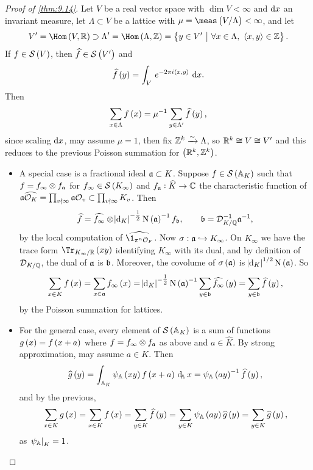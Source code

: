 \begin{proof}[Proof of \ref{thm:9.14}]
Let $ V $ be a real vector space with $ \dim V < \infty $ and $ \mathrm{d} x $ an invariant measure, let $ \Lambda \subset V $ be a lattice with $ \mu = \meas\br{V / \Lambda} < \infty $, and let
$$ V' = \Hom\br{V, \RR} \supset \Lambda' = \Hom\br{\Lambda, \ZZ} = \cbr{y \in V' \st \forall x \in \Lambda, \ \abr{x, y} \in \ZZ}. $$
If $ f \in \SSS\br{V} $, then $ \widehat{f} \in \SSS\br{V'} $ and
$$ \widehat{f}\br{y} = \intd{V}{}{e^{-2\pi i\abr{x, y}}}{x}. $$
Then
$$ \sum_{x \in \Lambda} f\br{x} = \mu^{-1}\sum_{y \in \Lambda'} \widehat{f}\br{y}, $$
since scaling $ \mathrm{d} x $, may assume $ \mu = 1 $, then fix $ \mathbb{Z}^k \xrightarrow{\sim} \Lambda $, so $ \mathbb{R}^k \cong V \cong V' $ and this reduces to the previous Poisson summation for $ \br{\RR^k, \ZZ^k} $.

\pagebreak

\begin{itemize}
\item A special case is a fractional ideal $ \mathfrak{a} \subset K $. Suppose $ f \in \SSS\br{\AA_K} $ such that $ f = f_\infty \otimes f_{\mathfrak{a}} $ for $ f_\infty \in \SSS\br{K_\infty} $ and $ f_{\mathfrak{a}} : \widehat{K} \to \mathbb{C} $ the characteristic function of $ \mathfrak{a}\widehat{\mathcal{O}_K} = \prod_{v \nmid \infty} \mathfrak{a}\mathcal{O}_v \subset \prod_{v \nmid \infty} K_v $. Then
$$ \widehat{f} = \widehat{f_\infty} \otimes \abs{\d_K}^{-\tfrac{1}{2}}\N\br{\aaa}^{-1}f_\bbb, \qquad \bbb = \DDD_{K / \QQ}^{-1}\aaa^{-1}, $$
by the local computation of $ \widehat{\1_{\pi^n\OOO_F}} $. Now $ \sigma : \mathfrak{a} \hookrightarrow K_\infty $. On $ K_\infty $ we have the trace form $ \Tr_{K_\infty / \RR}\br{xy} $ identifying $ K_\infty $ with its dual, and by definition of $ \mathcal{D}_{K / \mathbb{Q}} $, the dual of $ \mathfrak{a} $ is $ \mathfrak{b} $. Moreover, the covolume of $ \sigma\br{\aaa} $ is $ \abs{\d_K}^{1 / 2}\N\br{\aaa} $. So
$$ \sum_{x \in K} f\br{x} = \sum_{x \in \aaa} f_\infty\br{x} = \abs{\d_K}^{-\tfrac{1}{2}}\N\br{\aaa}^{-1}\sum_{y \in \bbb} \widehat{f_\infty}\br{y} = \sum_{y \in \bbb} \widehat{f}\br{y}, $$
by the Poisson summation for lattices.
\item For the general case, every element of $ \SSS\br{\AA_K} $ is a sum of functions $ g\br{x} = f\br{x + a} $ where $ f = f_\infty \otimes f_{\mathfrak{a}} $ as above and $ a \in \widehat{K} $. By strong approximation, may assume $ a \in K $. Then
$$ \widehat{g}\br{y} = \intA{\psi_\AA\br{xy}f\br{x + a}}{x} = \psi_\AA\br{ay}^{-1}\widehat{f}\br{y}, $$
and by the previous,
$$ \sum_{x \in K} g\br{x} = \sum_{x \in K} f\br{x} = \sum_{y \in K} \widehat{f}\br{y} = \sum_{y \in K} \psi_\AA\br{ay}\widehat{g}\br{y} = \sum_{y \in K} \widehat{g}\br{y}, $$
as $ \left. \psi_{\mathbb{A}} \right|_K = 1 $.
\end{itemize}
\end{proof}

